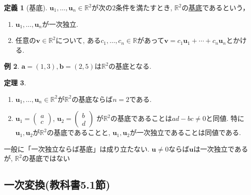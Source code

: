 \documentclass[dvipdfmx,a4paper,11pt]{article}
\newcommand{\R}{\mathbb{R}}
\theoremstyle{definition}
\newtheorem{thm}{定理}
\newtheorem{dfn}[thm]{定義}
\newtheorem{exa}[thm]{例}
\begin{document}
\begin{tcolorbox}[
    colback = white,
    colframe = green!35!black,
    fonttitle = \bfseries,
    breakable = true]
    \begin{dfn}[基底]
  $\bm{u}_1, \ldots, \bm{u}_n \in \R^2 $が次の2条件を満たすとき, $\R^2$の\underline{基底}であるという， 
    \begin{enumerate}
	\setlength{\parskip}{0cm}
  	\setlength{\itemsep}{0pt} 
\item $\bm{u}_1, \ldots, \bm{u}_n $が一次独立.
\item 任意の$\bm{v} \in \R^2$について, ある$c_1, \ldots, c_n \in \R$があって$\bm{v} = c_1\bm{u}_1 + \cdots + c_n\bm{u}_n $とかける.
\end{enumerate}
    \end{dfn}
 \end{tcolorbox}
 
  \begin{exa}
 $\bm{a}=(1,3), \bm{b} = (2,5)$は$\R^2$の基底となる. 
\end{exa}

 
\begin{tcolorbox}[
    colback = white,
    colframe = green!35!black,
    fonttitle = \bfseries,
    breakable = true]
    \begin{thm}
    \begin{enumerate}
	\setlength{\parskip}{0cm}
  	\setlength{\itemsep}{0pt} 
\item   $\bm{u}_1, \ldots, \bm{u}_n \in \R^2 $が$\R^2$の基底ならば$n=2$である. 
\item$\bm{u}_1 =   
\begin{pmatrix}
a \\
 c
 \end{pmatrix} $, 
 $\bm{u}_2 =   
\begin{pmatrix}
b \\
 d
 \end{pmatrix} $
 が$\R^2$の基底であることは$ad-bc \neq 0$と同値. 特に$\bm{u}_1, \bm{u}_2$が$\R^2$の基底であることと, $\bm{u}_1, \bm{u}_2$が一次独立であることは同値である.
\end{enumerate}
    \end{thm}
 \end{tcolorbox}

一般に「一次独立ならば基底」は成り立たない. 
$\bm{u}\neq 0$ならば$\bm{u}$は一次独立であるが, $\R^2$の基底ではない
 
 \subsection{一次変換(教科書5.1節)}
 
\end{document}
